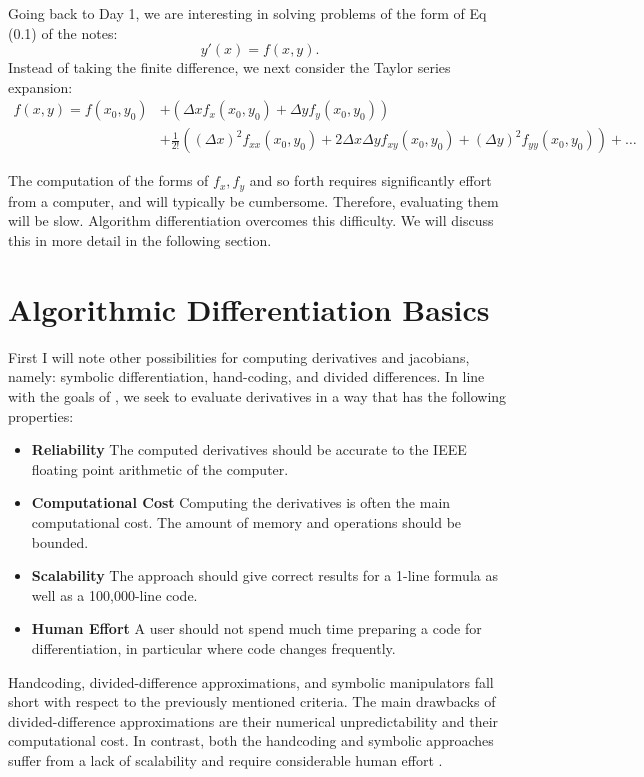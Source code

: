 \documentclass[11pt]{article}
\def\f{\frac }
\begin{document}
Going back to Day 1, we are interesting in solving problems of the form of Eq (0.1) of the notes:
\[ y'(x) = f(x,y) .\]
Instead of taking the finite difference, we next consider the Taylor series expansion:
\begin{align*} f(x,y) = f(x_0,y_0) &+ \left (\Delta x f_x (x_0,y_0)+ \Delta y f_y (x_0,y_0)\right ) \\
&+ \f{1}{2!} \left ( \left ( \Delta x\right ) ^2 f_{xx} (x_0,y_0) + 2\Delta x \Delta y f_{xy} (x_0,y_0) + \left ( \Delta y \right ) ^2 f_{yy} (x_0,y_0) \right ) + \ldots \end{align*}

The computation of the forms of $f_x,f_y$ and so forth requires significantly effort from a computer, and will typically be cumbersome.
Therefore, evaluating them will be slow.
Algorithm differentiation overcomes this difficulty.
We will discuss this in more detail in the following section.

\pagebreak
\section{Algorithmic Differentiation Basics}

First I will note other possibilities for computing derivatives and jacobians, namely: symbolic differentiation, hand-coding, and divided differences.
In line with the goals of \cite{bischof2000computing}, we seek to evaluate derivatives in a way that has the following properties:
\begin{itemize}
\item {\bf Reliability} The computed derivatives should be accurate to the IEEE floating point arithmetic of the computer.
\item {\bf Computational Cost} Computing the derivatives is often the main computational cost. The amount of memory and operations should be bounded.
\item {\bf Scalability} The approach should give correct results for a 1-line formula as well as a 100,000-line code.
\item {\bf Human Effort} A user should not spend much time preparing a code for differentiation, in particular where code changes frequently.
\end{itemize}

Handcoding, divided-difference approximations, and symbolic manipulators fall short with respect to the previously mentioned criteria. The main drawbacks of divided-difference approximations are their numerical unpredictability and their computational cost. 
In contrast, both the handcoding and symbolic approaches suffer from a lack of scalability and require considerable human effort \cite{bischof2000computing}.
\end{document}
